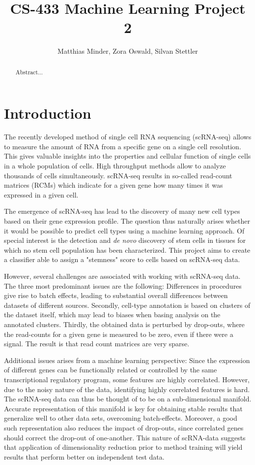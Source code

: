 \documentclass[10pt,conference,compsocconf]{IEEEtran}
\begin{document}
\title{CS-433 Machine Learning Project 2}

\author{
  Matthias Minder, Zora Oswald, Silvan Stettler\\
}

\maketitle

\begin{abstract}
Abstract...
\end{abstract}

\section*{Introduction} 
The recently developed method of single cell RNA sequencing (scRNA-seq) allows to measure the amount of RNA from a specific gene on a single cell resolution. This gives valuable insights into the properties and cellular function of single cells in a whole population of cells. High throughput methods allow to analyze thousands of cells simultaneously. scRNA-seq results in so-called read-count matrices (RCMs) which indicate for a given gene how many times it was expressed in a given cell.
\par 
The emergence of scRNA-seq has lead to the discovery of many new cell types based on their gene expression profile. The question thus naturally arises whether it would be possible to predict cell types using a machine learning approach. Of special interest is the detection and \textit{de novo} discovery of stem cells in tissues for which no stem cell population has been characterized. This project aims to create a classifier able to assign a "stemness" score to cells based on scRNA-seq data. 
\par
However, several challenges are associated with working with scRNA-seq data. The three most predominant issues are the following: Differences in procedures give rise to batch effects, leading to substantial overall differences between datasets of different sources. Secondly, cell-type annotation is based on clusters of the dataset itself, which may lead to biases when basing analysis on the annotated clusters. Thirdly, the obtained data is perturbed by drop-outs, where the read-counts for a given gene is measured to be zero, even if there were a signal. The result is that read count matrices are very sparse. 
\par
Additional issues arises from a machine learning perspective: Since the expression of different genes can be functionally related or controlled by the same transcriptional regulatory program, some features are highly correlated. However, due to the noisy nature of the data, identifying highly correlated features is hard. The scRNA-seq data can thus be thought of to be on a sub-dimensional manifold. Accurate representation of this manifold is key for obtaining stable results that generalize well to other data sets, overcoming batch-effects. Moreover, a good such representation also reduces the impact of drop-outs, since correlated genes should correct the drop-out of one-another. This nature of scRNA-data suggests that application of dimensionality reduction prior to method training will yield results that perform better on independent test data. 
\end{document}

